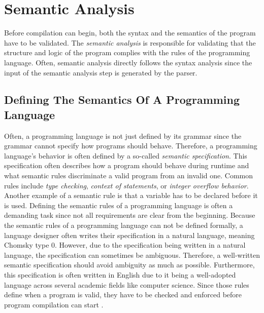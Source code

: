 \section{Semantic Analysis}
Before compilation can begin, both the syntax and the semantics of the program have to be validated.
The \emph{semantic analysis} is responsible for validating that the structure and logic of the program complies with the rules of the programming language.
Often, semantic analysis directly follows the syntax analysis since the input of the semantic analysis step is generated by the parser.

\subsection{Defining The Semantics Of A Programming Language}
Often, a programming language is not just defined by its grammar
since the grammar cannot specify how programs should behave.
Therefore, a programming language's behavior is often defined by a so-called \emph{semantic specification}.
This specification often describes how a program should behave during runtime and what semantic rules discriminate a valid program from an invalid one.
Common rules include \emph{type checking}, \emph{context of statements}, or \emph{integer overflow behavior}.
Another example of a semantic rule is that a variable has to be declared before it is used.
Defining the semantic rules of a programming language is often a demanding task
since not all requirements are clear from the beginning.
Because the semantic rules of a programming language can not be defined formally,
a language designer often writes their specification in a natural language, meaning Chomsky type 0.
However, due to the specification being written in a natural language, the specification can sometimes be ambiguous.
Therefore, a well-written semantic specification should avoid ambiguity as much as possible.
Furthermore, this specification is often written in English
due to it being a well-adopted language across several academic fields like computer science.
Since those rules define when a program is valid, they have to be checked and enforced before program compilation can start
\cite[p.~21]{a_practical_guide_compiler_construction_watson_2017}.

